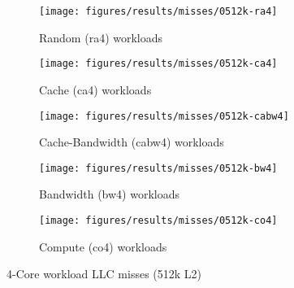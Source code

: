 \begin{figure}
    \centering
    \begin{subfigure}[b]{\textwidth}
            \texttt{[image: figures/results/misses/0512k-ra4]}
            \caption{Random (ra4) workloads}
            \label{fig:results:4core:misses:random}
    \end{subfigure}

    \begin{subfigure}[b]{0.5\textwidth}
            \texttt{[image: figures/results/misses/0512k-ca4]}
            \caption{Cache (ca4) workloads}
            \label{fig:results:4core:misses:cache}
    \end{subfigure}%
    \begin{subfigure}[b]{0.5\textwidth}
            \texttt{[image: figures/results/misses/0512k-cabw4]}
            \caption{Cache-Bandwidth (cabw4) workloads}
            \label{fig:results:4core:misses:cache-bw}
    \end{subfigure}

    \begin{subfigure}[b]{0.5\textwidth}
            \texttt{[image: figures/results/misses/0512k-bw4]}
            \caption{Bandwidth (bw4) workloads}
            \label{fig:results:4core:misses:bw}
    \end{subfigure}%
    \begin{subfigure}[b]{0.5\textwidth}
            \texttt{[image: figures/results/misses/0512k-co4]}
            \caption{Compute (co4) workloads}
            \label{fig:results:4core:misses:co}
    \end{subfigure}%

    \caption{4-Core workload LLC misses (512k L2)}\label{fig:results:4core:misses}
\end{figure}